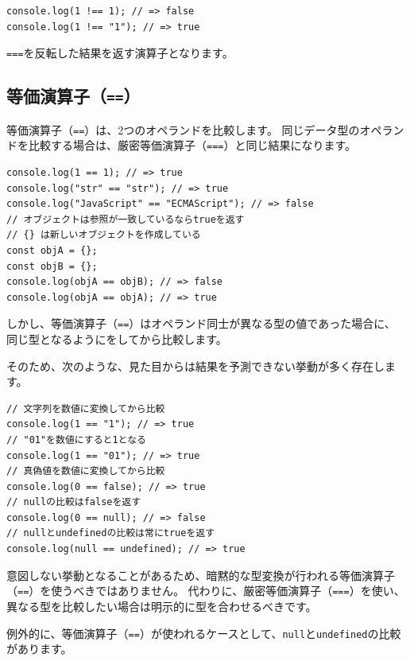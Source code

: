 \begin{lstlisting}
console.log(1 !== 1); // => false
console.log(1 !== "1"); // => true
\end{lstlisting}

\texttt{===}を反転した結果を返す演算子となります。

\hypertarget{equal-operator}{%
\subsection{\texorpdfstring{等価演算子（\texttt{==}）}{等価演算子（==）}}\label{equal-operator}}

等価演算子（\texttt{==}）は、2つのオペランドを比較します。
同じデータ型のオペランドを比較する場合は、厳密等価演算子（\texttt{===}）と同じ結果になります。

\begin{lstlisting}
console.log(1 == 1); // => true
console.log("str" == "str"); // => true
console.log("JavaScript" == "ECMAScript"); // => false
// オブジェクトは参照が一致しているならtrueを返す
// {} は新しいオブジェクトを作成している
const objA = {};
const objB = {};
console.log(objA == objB); // => false
console.log(objA == objA); // => true
\end{lstlisting}

しかし、等価演算子（\texttt{==}）はオペランド同士が異なる型の値であった場合に、
同じ型となるように\textbf{}をしてから比較します。

そのため、次のような、見た目からは結果を予測できない挙動が多く存在します。

\begin{lstlisting}
// 文字列を数値に変換してから比較
console.log(1 == "1"); // => true
// "01"を数値にすると1となる
console.log(1 == "01"); // => true
// 真偽値を数値に変換してから比較
console.log(0 == false); // => true
// nullの比較はfalseを返す
console.log(0 == null); // => false
// nullとundefinedの比較は常にtrueを返す
console.log(null == undefined); // => true
\end{lstlisting}

意図しない挙動となることがあるため、暗黙的な型変換が行われる等価演算子（\texttt{==}）を使うべきではありません。
代わりに、厳密等価演算子（\texttt{===}）を使い、異なる型を比較したい場合は明示的に型を合わせるべきです。

例外的に、等価演算子（\texttt{==}）が使われるケースとして、\texttt{null}と\texttt{undefined}の比較があります。

